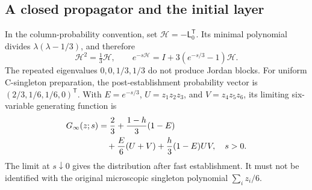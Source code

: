 \documentclass[aps,pre,reprint,amsmath,amssymb,longbibliography]{revtex4-2}
\begin{document}
\subsection{A closed propagator and the initial layer}
In the column-probability convention, set
$\mathcal H=-\mathsf L_0^{\mathsf T}$. Its minimal polynomial divides
$\lambda(\lambda-1/3)$, and therefore
\begin{equation}
 \mathcal H^2=\tfrac13\mathcal H,\qquad
 e^{-s\mathcal H}=I+3(e^{-s/3}-1)\mathcal H.
 \label{eq:app-p6-propagator}
\end{equation}
The repeated eigenvalues $0,0,1/3,1/3$ do not produce Jordan blocks.
For uniform C-singleton preparation, the post-establishment probability
vector is $(2/3,1/6,1/6,0)^{\mathsf T}$. With
$E=e^{-s/3}$, $U=z_1z_2z_3$, and $V=z_4z_5z_6$, its limiting
six-variable generating function is
 \begin{align}
 G_\infty(z;s)&=\frac23+\frac{1-h}{3}(1-E) \label{eq:app-p6-pgf}
\\
 &\quad+\frac E6(U+V)+\frac h3(1-E)UV,\quad s>0. \notag
 \end{align}
 The limit at $s\downarrow0$ gives the distribution after fast
establishment. It must not be identified with the original microscopic
singleton polynomial $\sum_i z_i/6$.
\end{document}

